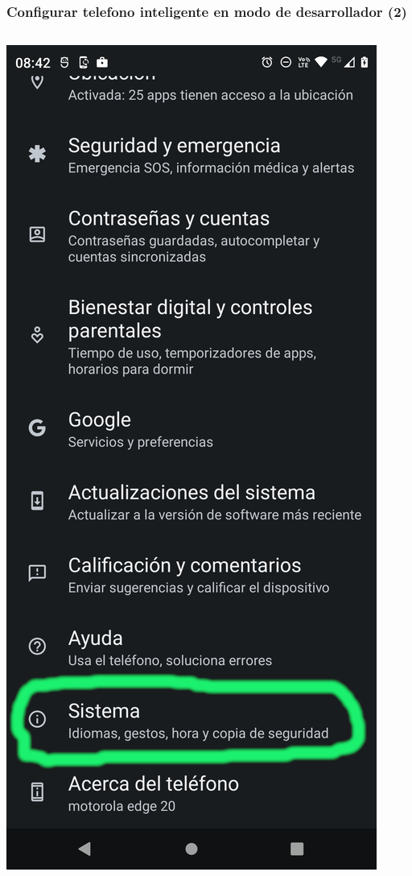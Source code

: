 \begin{frame}
\frametitle{Configurar telefono inteligente en modo de desarrollador (2)}  
\begin{columns}
\begin{center}
\includegraphics[width=0.95\linewidth]{00_Configurar/ModoDesarrollador5.png}    

\end{center}
\end{columns}
\end{frame}

